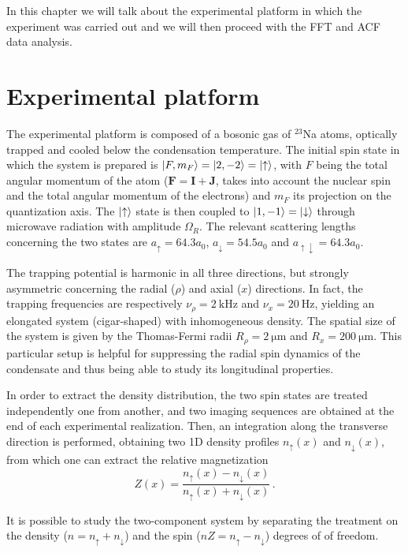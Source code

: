 In this chapter we will talk about the experimental platform in which the experiment was carried out and we will then proceed with the FFT and ACF data analysis.

\section{Experimental platform}
The experimental platform is composed of a bosonic gas of $^{23}$Na atoms, optically trapped and cooled below the condensation temperature. The initial spin state in which the system is prepared is $\ket{F, m_F} = \ket{2, -2} = \ket{\uparrow}$, with $F$ being the total angular momentum of the atom ($\mathbf{F} = \mathbf{I} + \mathbf{J}$, takes into account the nuclear spin and the total angular momentum of the electrons) and $m_F$ its projection on the quantization axis. The $\ket{\uparrow}$ state is then coupled to $\ket{1, -1} = \ket{\downarrow}$ through microwave radiation with amplitude $\Omega_R$. The relevant scattering lengths concerning the two states are $a_\uparrow = 64.3 a_0$, $a_\downarrow = 54.5 a_0$ and $a_{\uparrow\downarrow} = 64.3 a_0$.

The trapping potential is harmonic in all three directions, but strongly asymmetric concerning the radial ($\rho$) and axial ($x$) directions. In fact, the trapping frequencies are respectively $\nu_\rho = 2\ \unit{\kilo\hertz}$ and $\nu_x = 20\ \unit{\hertz}$, yielding an elongated system (cigar-shaped) with inhomogeneous density. The spatial size of the system is given by the Thomas-Fermi radii $R_\rho = 2\ \unit{\micro\meter}$ and $R_x = 200\ \unit{\micro\meter}$. This particular setup is helpful for suppressing the radial spin dynamics of the condensate and thus being able to study its longitudinal properties.

In order to extract the density distribution, the two spin states are treated independently one from another, and two imaging sequences are obtained at the end of each experimental realization. Then, an integration along the transverse direction is performed, obtaining two 1D density profiles $n_\uparrow(x)$ and $n_\downarrow(x)$, from which one can extract the relative magnetization
\begin{equation}
    Z(x) = \frac{n_\uparrow(x) - n_\downarrow(x)}{n_\uparrow(x) + n_\downarrow(x)}\, .
    \label{eq:magnetization}
\end{equation}

It is possible to study the two-component system by separating the treatment on the density ($n = n_\uparrow + n_\downarrow$) and the spin ($nZ = n_\uparrow - n_\downarrow$) degrees of of freedom. 

